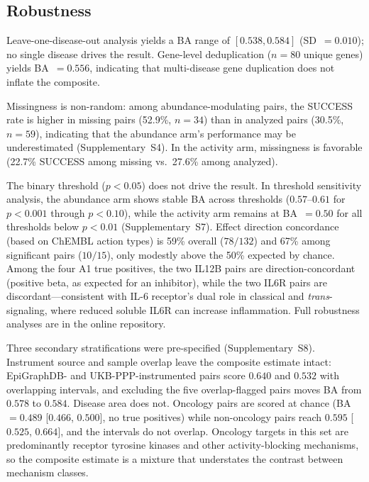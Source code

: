 \documentclass[11pt]{article}
\begin{document}
\subsection{Robustness}
\label{sec:robustness}

Leave-one-disease-out analysis yields a BA range of $[0.538, 0.584]$ (SD~$= 0.010$); no single disease drives the result. Gene-level deduplication ($n = 80$ unique genes) yields BA~$= 0.556$, indicating that multi-disease gene duplication does not inflate the composite.

Missingness is non-random: among abundance-modulating pairs, the SUCCESS rate is higher in missing pairs (52.9\%, $n = 34$) than in analyzed pairs (30.5\%, $n = 59$), indicating that the abundance arm's performance may be underestimated (Supplementary~S4). In the activity arm, missingness is favorable (22.7\% SUCCESS among missing vs.\ 27.6\% among analyzed).

The binary threshold ($p < 0.05$) does not drive the result. In threshold sensitivity analysis, the abundance arm shows stable BA across thresholds ($0.57$--$0.61$ for $p < 0.001$ through $p < 0.10$), while the activity arm remains at BA~$= 0.50$ for all thresholds below $p < 0.01$ (Supplementary~S7). Effect direction concordance (based on ChEMBL action types) is 59\% overall ($78/132$) and 67\% among significant pairs ($10/15$), only modestly above the 50\% expected by chance. Among the four A1 true positives, the two IL12B pairs are direction-concordant (positive beta, as expected for an inhibitor), while the two IL6R pairs are discordant---consistent with IL-6 receptor's dual role in classical and \emph{trans}-signaling, where reduced soluble IL6R can increase inflammation. Full robustness analyses are in the online repository.

Three secondary stratifications were pre-specified (Supplementary~S8). Instrument source and sample overlap leave the composite estimate intact: EpiGraphDB- and UKB-PPP-instrumented pairs score $0.640$ and $0.532$ with overlapping intervals, and excluding the five overlap-flagged pairs moves BA from $0.578$ to $0.584$. Disease area does not. Oncology pairs are scored at chance (BA~$= 0.489$ [$0.466$, $0.500$], no true positives) while non-oncology pairs reach $0.595$ [$0.525$, $0.664$], and the intervals do not overlap. Oncology targets in this set are predominantly receptor tyrosine kinases and other activity-blocking mechanisms, so the composite estimate is a mixture that understates the contrast between mechanism classes.
\end{document}
